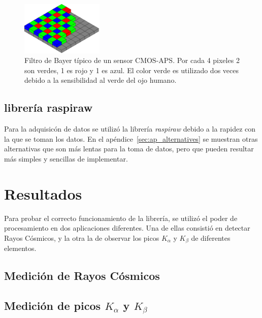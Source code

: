     \begin{figure}[h]
      \includegraphics[width=0.35\textwidth]{figures/Bayer_pattern.png}
      \caption{Filtro de Bayer típico de un sensor CMOS-APS. Por cada 4 pixeles 2 son verdes, 1 es rojo y 1 es azul.
        El color verde es utilizado dos veces debido a la sensibilidad al verde del ojo humano.}
      \label{fig:bayer}
    \end{figure}

    \subsection{librería raspiraw}
    Para la adquisicón de datos se utilizó la librería {\it raspiraw}\cite{raspiraw} debido a la rapidez con la que se toman los datos.
    En el apéndice~\ref{sec:ap_alternatives} se muestran otras alternativas que son más lentas para la toma de datos,
    pero que pueden resultar más simples y sencillas de implementar.


    
    \section{Resultados}
    Para probar el correcto funcionamiento de la librería, se utilizó el poder de procesamiento en dos aplicaciones diferentes.
    Una de ellas consistió en detectar Rayos Cósmicos, y la otra la de observar los picos $K_{\alpha}$ y $K_{\beta}$ de diferentes elementos.
    
    \subsection{Medición de Rayos Cósmicos}

    \subsection{Medición de picos $K_{\alpha}$ y $K_{\beta}$}

